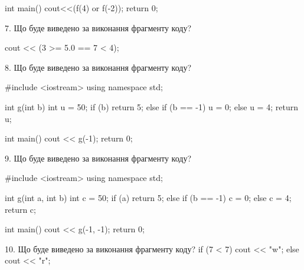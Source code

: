 \documentclass[11pt, ukrainian]{article}
\begin{document}
\begin{large}
int main(){
    cout<<(f(4) or f(-2));
    return 0;
}


7. Що буде виведено за виконання фрагменту коду?

cout << (3 >= 5.0 == 7 < 4);


8. Що буде виведено за виконання фрагменту коду?

#include <iostream>
using namespace std;

int g(int b){
    int u = 50;
    if (b) 
        return 5;
    else if (b == -1)
         u = 0;
    else
         u = 4;
    return u;
}

int main(){
    cout << g(-1);
    return 0;
}



9. Що буде виведено за виконання фрагменту коду?

#include <iostream>
using namespace std;

int g(int a, int b){
    int c = 50;
    if (a)
        return 5;
    else if (b == -1)
         c = 0;
    else 
        c = 4;
    return c;
}

int main(){
    cout << g(-1, -1);
    return 0;
}


10. Що буде виведено за виконання фрагменту коду?
if (7 < 7)
    cout << "w";
else
    cout << "r";


\end{large}
\vspace{20mm}
\end{document}
